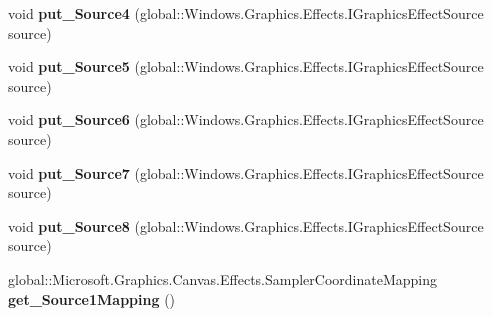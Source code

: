 \begin{DoxyCompactItemize}
\item 
\mbox{\label{interface_microsoft_1_1_graphics_1_1_canvas_1_1_effects_1_1_i_pixel_shader_effect_afafa635fb2d11e250a68e6b327ec53af}} 
void {\bfseries put\+\_\+\+Source4} (global\+::\+Windows.\+Graphics.\+Effects.\+I\+Graphics\+Effect\+Source source)
\item 
\mbox{\label{interface_microsoft_1_1_graphics_1_1_canvas_1_1_effects_1_1_i_pixel_shader_effect_ae260b34f39bc080e73acdd26d041f5cb}} 
void {\bfseries put\+\_\+\+Source5} (global\+::\+Windows.\+Graphics.\+Effects.\+I\+Graphics\+Effect\+Source source)
\item 
\mbox{\label{interface_microsoft_1_1_graphics_1_1_canvas_1_1_effects_1_1_i_pixel_shader_effect_aa48daa54e2ea8e1e2ef8a46fa74e7c92}} 
void {\bfseries put\+\_\+\+Source6} (global\+::\+Windows.\+Graphics.\+Effects.\+I\+Graphics\+Effect\+Source source)
\item 
\mbox{\label{interface_microsoft_1_1_graphics_1_1_canvas_1_1_effects_1_1_i_pixel_shader_effect_aa7ce3eb158032965586e60ad9f66c98f}} 
void {\bfseries put\+\_\+\+Source7} (global\+::\+Windows.\+Graphics.\+Effects.\+I\+Graphics\+Effect\+Source source)
\item 
\mbox{\label{interface_microsoft_1_1_graphics_1_1_canvas_1_1_effects_1_1_i_pixel_shader_effect_a9de0ccbd0c5bcdc357e85517b3affe09}} 
void {\bfseries put\+\_\+\+Source8} (global\+::\+Windows.\+Graphics.\+Effects.\+I\+Graphics\+Effect\+Source source)
\item 
\mbox{\label{interface_microsoft_1_1_graphics_1_1_canvas_1_1_effects_1_1_i_pixel_shader_effect_a4b39b9369829e0d5d424e715749ff6dc}} 
global\+::\+Microsoft.\+Graphics.\+Canvas.\+Effects.\+Sampler\+Coordinate\+Mapping {\bfseries get\+\_\+\+Source1\+Mapping} ()
\item 

\end{DoxyCompactItemize}
